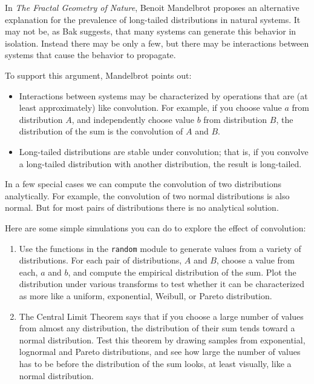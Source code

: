\documentclass[10pt]{book}
\begin{document}
\begin{ex}

In {\em The Fractal Geometry of Nature}, Benoit Mandelbrot proposes an
alternative explanation for the prevalence of long-tailed
distributions in natural systems.  It may not be, as Bak suggests,
that many systems can generate this behavior in isolation.  Instead
there may be only a few, but there may be interactions between systems
that cause the behavior to propagate.

To support this argument, Mandelbrot points out:

\begin{itemize}

\item Interactions between systems may be characterized by operations
  that are (at least approximately) like convolution.  For example,
  if you choose value $a$ from distribution $A$, and independently
  choose value $b$ from distribution $B$, the distribution of the
  sum is the convolution of $A$ and $B$.

\item Long-tailed distributions are stable under convolution; that is,
  if you convolve a long-tailed distribution with another
  distribution, the result is long-tailed.

\end{itemize}

In a few special cases we can compute the convolution of two
distributions analytically.  For example, the convolution of
two normal distributions is also normal.  But for most pairs
of distributions there is no analytical solution.

Here are some simple simulations you can do to explore the
effect of convolution:

\begin{enumerate}

\item Use the functions in the {\tt random} module to generate values
  from a variety of distributions.  For each pair of distributions,
  $A$ and $B$, choose a value from each, $a$ and $b$, and compute the
  empirical distribution of the sum.  Plot the distribution under
  various transforms to test whether it can be characterized as more
  like a uniform, exponential, Weibull, or Pareto distribution.

\item The Central Limit Theorem says that if you choose a large number
  of values from almost any distribution, the distribution of their
  sum tends toward a normal distribution.  Test this theorem by
  drawing samples from exponential, lognormal and Pareto
  distributions, and see how large the number of values has to be
  before the distribution of the sum looks, at least visually, like a
  normal distribution.


\end{enumerate}
\end{ex}
\end{document}
